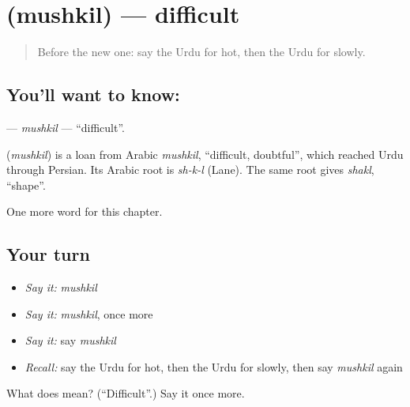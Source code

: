 \section[\texorpdfstring{\ur{مشکل} (mushkil)}{مشکل (mushkil)}]{ (mushkil) — difficult}

\label{lesson:UR-C71-mushkil}



\begin{quote}
Before the new one: say the Urdu for hot, then the Urdu for slowly.
\end{quote}

\subsection*{You'll want to know: }
\textbf{} — \emph{mushkil} — \textquotedblleft{}difficult\textquotedblright{}.

\begin{cousinweb}
\textbf{} (\emph{mushkil}) is a loan from Arabic \emph{mushkil}, \textquotedblleft{}difficult, doubtful\textquotedblright{}, which reached Urdu through Persian. Its Arabic root is \emph{sh-k-l} (Lane). The same root gives \emph{shakl}, \textquotedblleft{}shape\textquotedblright{}.
\end{cousinweb}

\begin{grammarlens}[title={What you've built}]
One more word for this chapter.
\end{grammarlens}

\subsection*{Your turn}
\begin{itemize}
\raggedright
  \item \emph{Say it:} \emph{mushkil}
  \item \emph{Say it:} \emph{mushkil}, once more
  \item \emph{Say it:} say \emph{mushkil}
  \item \emph{Recall:} say the Urdu for hot, then the Urdu for slowly, then say \emph{mushkil} again
\end{itemize}

\begin{tcolorbox}[breakable,colback=teal!4,colframe=teal!35!black,title={Before you move on}]
What does  mean? (\textquotedblleft{}Difficult\textquotedblright{}.) Say it once more.
\end{tcolorbox}
